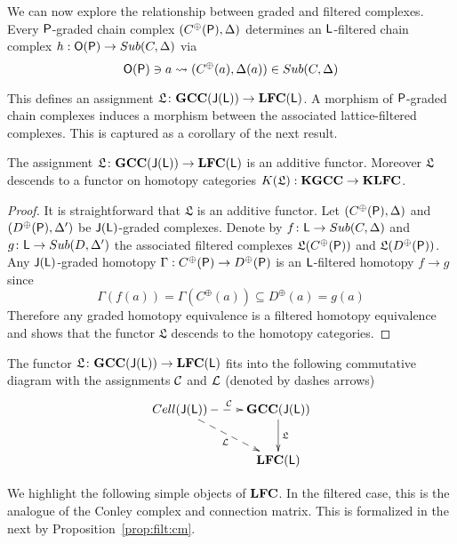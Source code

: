   
 We can now explore the relationship between graded and filtered complexes.  Every ${\mathsf P}$-graded chain complex $(C^\oplus({\mathsf P}),\Delta)$ determines an ${\mathsf L}$-filtered chain complex $h:{\mathsf O}({\mathsf P})\to Sub(C,\Delta)$ via $${\mathsf O}({\mathsf P})\ni a \rightsquigarrow (C^\oplus(a),\Delta(a))\in Sub(C,\Delta)$$


This defines an assignment $\mathfrak{L}\colon {\bf GCC}({\mathsf J}({\mathsf L}))\to {\bf LFC}({\mathsf L})$.  A morphism of ${\mathsf P}$-graded chain complexes induces a morphism between the associated lattice-filtered complexes.  This is captured as a corollary of the next result.


\begin{prop}\label{prop:filt:functor}
The assignment $\mathfrak{L}\colon {\bf GCC}({\mathsf J}({\mathsf L}))\to {\bf LFC}({\mathsf L})$ is an additive functor.  Moreover $\mathfrak{L}$ descends to a functor on homotopy categories $K(\mathfrak{L}):{\bf KGCC}\to {\bf KLFC}$.
\end{prop}
\begin{proof}
It is straightforward that $\mathfrak{L}$ is an additive functor.  Let $(C^\oplus({\mathsf P}),\Delta)$ and  $(D^\oplus({\mathsf P}),\Delta')$  be ${\mathsf J}({\mathsf L})$-graded complexes.  Denote by $f\colon {\mathsf L}\to Sub(C,\Delta)$ and $g\colon {\mathsf L}\to Sub(D,\Delta')$ the associated filtered complexes $\mathfrak{L}(C^\oplus({\mathsf P}))$ and $\mathfrak{L}(D^\oplus({\mathsf P}))$.  Any ${\mathsf J}({\mathsf L})$-graded homotopy $\Gamma:C^\oplus({\mathsf P})\to D^\oplus({\mathsf P})$ is an ${\mathsf L}$-filtered homotopy $f\to g$ since
\[
\Gamma(f(a))= \Gamma(C^\oplus(a)) \subseteq D^\oplus(a) = g(a)
\]
Therefore any graded homotopy equivalence is a filtered homotopy equivalence and  shows that the functor $\mathfrak{L}$ descends to the homotopy categories.
\end{proof}


\begin{prop}\label{prop:filt:functor2}
The functor $\mathfrak{L}\colon {\bf GCC}({\mathsf J}({\mathsf L}))\to {\bf LFC}({\mathsf L})$ fits into the following commutative diagram with the assignments ${\mathcal C}$ and ${\mathcal L}$ (denoted by dashes arrows)
\[
\xymatrixrowsep{0.35in}
\xymatrixcolsep{0.35in}
\xymatrix{
Cell(\sJ(\sL)) \ar@{-->}[dr]_{\cL} \ar@{-->}[r]^{\cC} & {\bf GCC(\sJ(\sL))} \ar[d]^{\mathfrak{L}} \\
 & {\bf LFC(\sL)}
}
\]
\end{prop}

We highlight the following simple objects of ${\bf LFC}$. In the filtered case, this is the analogue of the Conley complex and connection matrix.  This is formalized in the next by Proposition~\ref{prop:filt:cm}.



